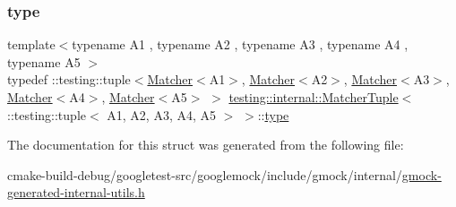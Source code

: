 \subsubsection{\texorpdfstring{type}{type}}
{\footnotesize\ttfamily template$<$typename A1 , typename A2 , typename A3 , typename A4 , typename A5 $>$ \\
typedef \+::testing\+::tuple$<$\mbox{\hyperlink{classtesting_1_1Matcher}{Matcher}}$<$A1$>$, \mbox{\hyperlink{classtesting_1_1Matcher}{Matcher}}$<$A2$>$, \mbox{\hyperlink{classtesting_1_1Matcher}{Matcher}}$<$A3$>$, \mbox{\hyperlink{classtesting_1_1Matcher}{Matcher}}$<$A4$>$, \mbox{\hyperlink{classtesting_1_1Matcher}{Matcher}}$<$A5$>$ $>$ \mbox{\hyperlink{structtesting_1_1internal_1_1MatcherTuple}{testing\+::internal\+::\+Matcher\+Tuple}}$<$ \+::testing\+::tuple$<$ A1, A2, A3, A4, A5 $>$ $>$\+::\mbox{\hyperlink{structtesting_1_1internal_1_1MatcherTuple_3_01_1_1testing_1_1tuple_3_01A1_00_01A2_00_01A3_00_01A4_00_01A5_01_4_01_4_a3c6f888e9aee4d15d4b5821eeff658d4}{type}}}



The documentation for this struct was generated from the following file\+:\begin{DoxyCompactItemize}
\item 
cmake-\/build-\/debug/googletest-\/src/googlemock/include/gmock/internal/\mbox{\hyperlink{gmock-generated-internal-utils_8h}{gmock-\/generated-\/internal-\/utils.\+h}}\end{DoxyCompactItemize}
